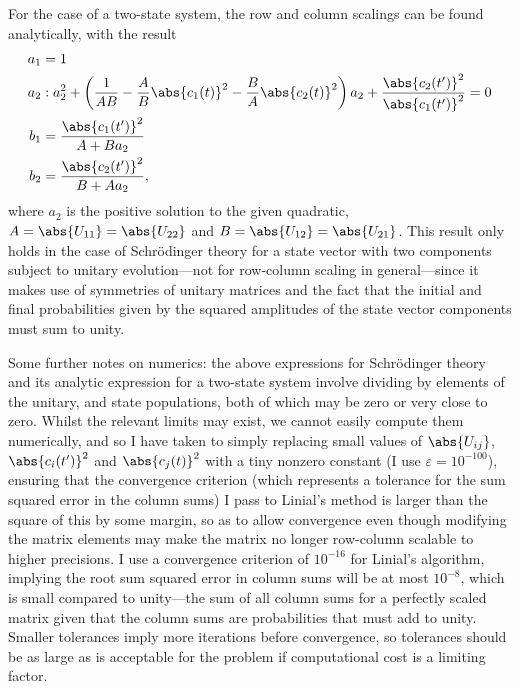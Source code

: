 For the case of a two-state system, the row and column scalings can be found analytically, with the result
\begin{align}
a_1 &= 1\\
a_2 &: a_2^2 + 
\left(\frac1{AB} - \frac AB \abs{c_1(t)}^2 - \frac BA \abs{c_2(t)}^2\right)a_2
+ \frac{\abs{c_2(t^\prime)}^2}{\abs{c_1(t^\prime)}^2} = 0\\
b_1 &= \frac{\abs{c_1(t^\prime)}^2}{A + B a_2}\\
b_2 &= \frac{\abs{c_2(t^\prime)}^2}{B + A a_2},
\end{align}
where $a_2$ is the positive solution to the given quadratic, $A = \abs{U_{11}} = \abs{U_{22}}$ and $B = \abs{U_{12}} = \abs{U_{21}}$. This result only holds in the case of Schr\"odinger theory for a state vector with two components subject to unitary evolution---not for row-column scaling in general---since it makes use of symmetries of unitary matrices and the fact that the initial and final probabilities given by the squared amplitudes of the state vector components must sum to unity.

Some further notes on numerics: the above expressions for Schr\"odinger theory and its analytic expression for a two-state system involve dividing by elements of the unitary, and state populations, both of which may be zero or very close to zero. Whilst the relevant limits may exist, we cannot easily compute them numerically, and so I have taken to simply replacing small values of $\abs{U_{ij}}$, $\abs{c_i(t^\prime)}^2$ and $\abs{c_j(t)}^2$ with a tiny nonzero constant (I use $\varepsilon=10^{-100}$), ensuring that the convergence criterion (which represents a tolerance for the sum squared error in the column sums) I pass to Linial's method is larger than the square of this by some margin, so as to allow convergence even though modifying the matrix elements may make the matrix no longer row-column scalable to higher precisions. I use a convergence criterion of $10^{-16}$ for Linial's algorithm, implying the root sum squared error in column sums will be at most $10^{-8}$, which is small compared to unity---the sum of all column sums for a perfectly scaled matrix given that the column sums are probabilities that must add to unity. Smaller tolerances imply more iterations before convergence, so tolerances should be as large as is acceptable for the problem if computational cost is a limiting factor.

